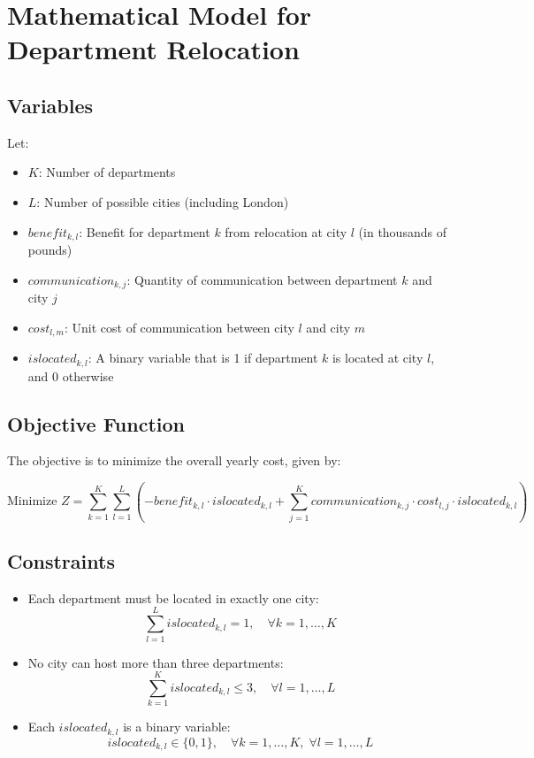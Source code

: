 \documentclass{article}
\begin{document}
\section*{Mathematical Model for Department Relocation}

\subsection*{Variables}
Let:
\begin{itemize}
    \item $K$: Number of departments
    \item $L$: Number of possible cities (including London)
    \item $benefit_{k, l}$: Benefit for department $k$ from relocation at city $l$ (in thousands of pounds)
    \item $communication_{k, j}$: Quantity of communication between department $k$ and city $j$
    \item $cost_{l, m}$: Unit cost of communication between city $l$ and city $m$
    \item $islocated_{k, l}$: A binary variable that is 1 if department $k$ is located at city $l$, and 0 otherwise
\end{itemize}

\subsection*{Objective Function}
The objective is to minimize the overall yearly cost, given by:

\[
\text{Minimize } Z = \sum_{k=1}^{K} \sum_{l=1}^{L} \left( -benefit_{k, l} \cdot islocated_{k, l} + \sum_{j=1}^{K} communication_{k, j} \cdot cost_{l, j} \cdot islocated_{k, l} \right)
\]

\subsection*{Constraints}
\begin{itemize}
    \item Each department must be located in exactly one city:
    \[
    \sum_{l=1}^{L} islocated_{k, l} = 1, \quad \forall k = 1, \ldots, K
    \]

    \item No city can host more than three departments:
    \[
    \sum_{k=1}^{K} islocated_{k, l} \leq 3, \quad \forall l = 1, \ldots, L
    \]

    \item Each $islocated_{k, l}$ is a binary variable:
    \[
    islocated_{k, l} \in \{0, 1\}, \quad \forall k = 1, \ldots, K, \; \forall l = 1, \ldots, L
    \]
\end{itemize}
\end{document}
